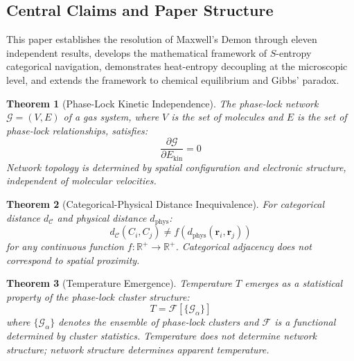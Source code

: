\documentclass[twocolumn,showpacs,preprintnumbers,amsmath,amssymb,prd]{revtex4-2}
\newtheorem{theorem}{Theorem}[section]
\theoremstyle{definition}
\theoremstyle{remark}
\newcommand{\phaselockgraph}{\mathcal{G}}
\newcommand{\catspace}{\mathcal{C}}
\begin{document}
\subsection{Central Claims and Paper Structure}

This paper establishes the resolution of Maxwell's Demon through eleven independent results, develops the mathematical framework of $S$-entropy categorical navigation, demonstrates heat-entropy decoupling at the microscopic level, and extends the framework to chemical equilibrium and Gibbs' paradox.

\begin{theorem}[Phase-Lock Kinetic Independence]
\label{thm:kinetic_independence}
The phase-lock network $\phaselockgraph = (V, E)$ of a gas system, where $V$ is the set of molecules and $E$ is the set of phase-lock relationships, satisfies:
\begin{equation}
\frac{\partial \phaselockgraph}{\partial E_{\text{kin}}} = 0
\label{eq:kinetic_independence}
\end{equation}
Network topology is determined by spatial configuration and electronic structure, independent of molecular velocities.
\end{theorem}

\begin{theorem}[Categorical-Physical Distance Inequivalence]
\label{thm:distance_inequivalence}
For categorical distance $d_{\catspace}$ and physical distance $d_{\text{phys}}$:
\begin{equation}
d_{\catspace}(C_i, C_j) \neq f(d_{\text{phys}}(\mathbf{r}_i, \mathbf{r}_j))
\label{eq:distance_inequivalence}
\end{equation}
for any continuous function $f: \mathbb{R}^+ \to \mathbb{R}^+$. Categorical adjacency does not correspond to spatial proximity.
\end{theorem}

\begin{theorem}[Temperature Emergence]
\label{thm:temperature_emergence}
Temperature $T$ emerges as a statistical property of the phase-lock cluster structure:
\begin{equation}
T = \mathcal{F}[\{\phaselockgraph_\alpha\}]
\label{eq:temperature_emergence}
\end{equation}
where $\{\phaselockgraph_\alpha\}$ denotes the ensemble of phase-lock clusters and $\mathcal{F}$ is a functional determined by cluster statistics. Temperature does not determine network structure; network structure determines apparent temperature.
\end{theorem}
\end{document}
